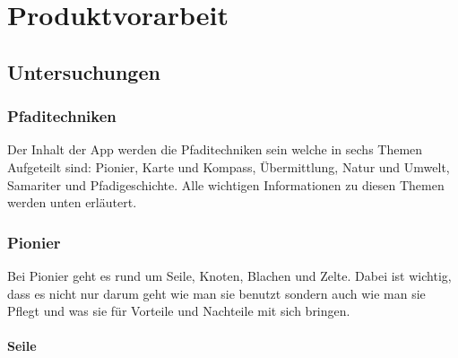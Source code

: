 \chapter{Produktvorarbeit}
\section{Untersuchungen}
\subsection*{Pfaditechniken}

Der Inhalt der App werden die Pfaditechniken sein welche in sechs Themen Aufgeteilt sind: Pionier, Karte und Kompass, Übermittlung, Natur und Umwelt, Samariter und Pfadigeschichte. Alle wichtigen Informationen zu diesen Themen werden unten erläutert.

\subsection*{Pionier}

Bei Pionier geht es rund um Seile, Knoten, Blachen und Zelte. Dabei ist wichtig, dass es nicht nur darum geht wie man sie benutzt sondern auch wie man sie Pflegt und was sie für Vorteile und Nachteile mit sich bringen.

\subsubsection*{Seile}

